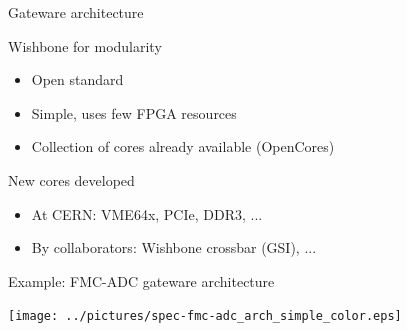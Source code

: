 \documentclass[compress,red]{beamer}
\begin{document}
\begin{frame}{Gateware architecture}

  \begin{block}{Wishbone for modularity}
    \begin{itemize}
    \item Open standard
    \item Simple, uses few FPGA resources
    \item Collection of cores already available (OpenCores)
    \end{itemize}
  \end{block}

  \begin{block}{New cores developed}
    \begin{itemize}
    \item At CERN: VME64x, PCIe, DDR3, ...
    \item By collaborators: Wishbone crossbar (GSI), ...
    \end{itemize}
  \end{block}


\end{frame}

\begin{frame}{Example: FMC-ADC gateware architecture}

  \begin{center}
    \texttt{[image: ../pictures/spec-fmc-adc\_arch\_simple\_color.eps]}
  \end{center}


\end{frame}


\end{document}
